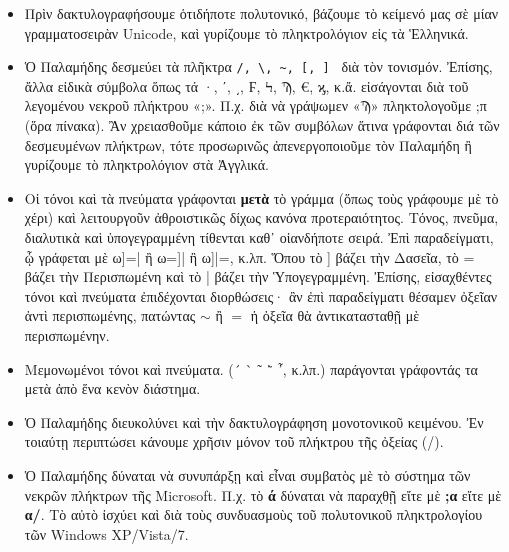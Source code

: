 \documentclass[12pt,a4paper]{article}
\begin{document}
\begin{itemize}
\begin{figure}[ht]
\begin{center}
                    \end{center}
                  \end{figure}
    \item{}Πρὶν δακτυλογραφήσουμε ὁτιδήποτε πολυτονικό, βάζουμε τὸ κείμενό 
          μας σὲ μίαν γραμματοσειρὰν Unicode, καὶ γυρίζουμε τὸ πληκτρολόγιον 
          εἰς τὰ Ἑλληνικά.
    \item{}Ὁ Παλαμήδης δεσμεύει τὰ πλῆκτρα \verb|/, \, ~, [, ] | διὰ τὸν
          τονισμόν. Ἐπίσης, ἄλλα εἰδικὰ σύμβολα ὅπως τά ·, ʹ, ͵, 
            Ϝ, Ϟ, Ϡ, €, ϗ, κ.ἄ. εἰσάγονται διὰ τοῦ λεγομένου νεκροῦ πλήκτρου
            «;». Π.χ. διὰ νὰ γράψωμεν «Ϡ» πληκτολογοῦμε ;π (ὅρα πίνακα). Ἂν
            χρειασθοῦμε κάποιο ἐκ τῶν συμβόλων ἅτινα γράφονται διά τῶν δεσμευμένων
            πλήκτρων, τότε προσωρινῶς ἀπενεργοποιοῦμε τὸν Παλαμήδη ἢ γυρίζουμε 
            τὸ πληκτρολόγιον στὰ Ἀγγλικά. 
    \item{}Οἱ τόνοι καὶ τὰ πνεύματα  γράφονται {\bf μετὰ} τὸ γράμμα
            (ὅπως τοὺς γράφουμε μὲ τὸ χέρι) καὶ λειτουργοῦν ἀθροιστικῶς
            δίχως κανόνα προτεραιότητος. Τόνος, πνεῦμα, διαλυτικὰ καὶ
            ὑπογεγραμμένη τίθενται καθ᾽ οἱανδήποτε σειρά. Ἐπὶ παραδείγματι,
            {\large ᾦ} γράφεται μὲ {\large ω]=|} ἢ {\large ω=]|}
            ἢ {\large ω]|=}, κ.λπ. Ὅπου τὸ ] βάζει τὴν Δασεῖα, τὸ
            = βάζει τὴν Περισπωμένη καὶ τὸ | βάζει τὴν Ὑπογεγραμμένη. 
            Ἐπίσης, εἰσαχθέντες τόνοι καὶ πνεύματα  ἐπιδέχονται διορθώσεις·
            ἂν ἐπὶ παραδείγματι θέσαμεν ὀξεῖαν ἀντὶ περισπωμένης, πατώντας
            {\bf$\sim$} ἢ {\bf$=$} ἡ ὀξεῖα θὰ ἀντικατασταθῇ μὲ περισπωμένην.

    \item{}Μεμονωμένοι τόνοι καὶ πνεύματα. (´{ }`{ }῀{ }῭{ }῏, κ.λπ.)  παράγονται
            γράφοντάς τα μετὰ ἀπὸ ἕνα κενὸν διάστημα.
    \item{}Ὁ Παλαμήδης διευκολύνει καὶ τὴν δακτυλογράφηση μονοτονικοῦ
           κειμένου. Ἐν τοιαύτῃ
            περιπτώσει κάνουμε χρῆσιν μόνον τοῦ πλήκτρου τῆς ὀξείας (/).
    \item{}Ὁ Παλαμήδης δύναται νὰ συνυπάρξῃ καὶ εἶναι συμβατὸς μὲ τὸ σύστημα τῶν
            νεκρῶν πλήκτρων τῆς Microsoft.  Π.χ.  τὸ {\bf ά} δύναται νὰ παραχθῇ
            εἴτε μὲ {\bf ;α} εἴτε μὲ {\bf α/}.  Τὸ αὐτὸ ἰσχύει καὶ διὰ τοὺς
            συνδυασμοὺς τοῦ πολυτονικοῦ πληκτρολογίου τῶν Windows
            XP/Vista/7.
  \end{itemize}

\end{document}
